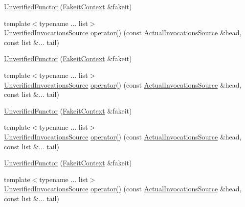 \begin{DoxyCompactItemize}
\item 
\mbox{\hyperlink{classfakeit_1_1UnverifiedFunctor_a5dcaec59e8d210db88b5600118e51426}{Unverified\+Functor}} (\mbox{\hyperlink{structfakeit_1_1FakeitContext}{Fakeit\+Context}} \&fakeit)
\item 
{\footnotesize template$<$typename ... list$>$ }\\\mbox{\hyperlink{structfakeit_1_1UnverifiedInvocationsSource}{Unverified\+Invocations\+Source}} \mbox{\hyperlink{classfakeit_1_1UnverifiedFunctor_a460588cf559622fd0b9e9b30c5f7c9c9}{operator()}} (const \mbox{\hyperlink{structfakeit_1_1ActualInvocationsSource}{Actual\+Invocations\+Source}} \&head, const list \&... tail)
\item 
\mbox{\hyperlink{classfakeit_1_1UnverifiedFunctor_a5dcaec59e8d210db88b5600118e51426}{Unverified\+Functor}} (\mbox{\hyperlink{structfakeit_1_1FakeitContext}{Fakeit\+Context}} \&fakeit)
\item 
{\footnotesize template$<$typename ... list$>$ }\\\mbox{\hyperlink{structfakeit_1_1UnverifiedInvocationsSource}{Unverified\+Invocations\+Source}} \mbox{\hyperlink{classfakeit_1_1UnverifiedFunctor_a460588cf559622fd0b9e9b30c5f7c9c9}{operator()}} (const \mbox{\hyperlink{structfakeit_1_1ActualInvocationsSource}{Actual\+Invocations\+Source}} \&head, const list \&... tail)
\item 
\mbox{\hyperlink{classfakeit_1_1UnverifiedFunctor_a5dcaec59e8d210db88b5600118e51426}{Unverified\+Functor}} (\mbox{\hyperlink{structfakeit_1_1FakeitContext}{Fakeit\+Context}} \&fakeit)
\item 
{\footnotesize template$<$typename ... list$>$ }\\\mbox{\hyperlink{structfakeit_1_1UnverifiedInvocationsSource}{Unverified\+Invocations\+Source}} \mbox{\hyperlink{classfakeit_1_1UnverifiedFunctor_a460588cf559622fd0b9e9b30c5f7c9c9}{operator()}} (const \mbox{\hyperlink{structfakeit_1_1ActualInvocationsSource}{Actual\+Invocations\+Source}} \&head, const list \&... tail)
\item 
\mbox{\hyperlink{classfakeit_1_1UnverifiedFunctor_a5dcaec59e8d210db88b5600118e51426}{Unverified\+Functor}} (\mbox{\hyperlink{structfakeit_1_1FakeitContext}{Fakeit\+Context}} \&fakeit)
\item 
{\footnotesize template$<$typename ... list$>$ }\\\mbox{\hyperlink{structfakeit_1_1UnverifiedInvocationsSource}{Unverified\+Invocations\+Source}} \mbox{\hyperlink{classfakeit_1_1UnverifiedFunctor_a460588cf559622fd0b9e9b30c5f7c9c9}{operator()}} (const \mbox{\hyperlink{structfakeit_1_1ActualInvocationsSource}{Actual\+Invocations\+Source}} \&head, const list \&... tail)

\end{DoxyCompactItemize}

